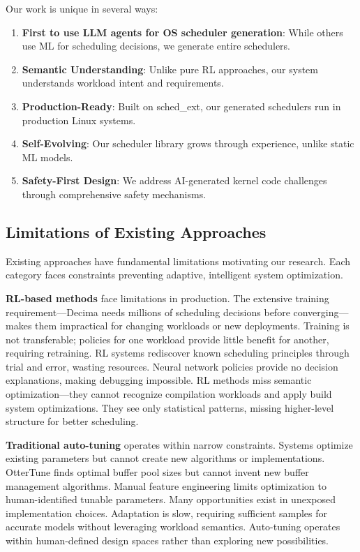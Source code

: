 Our work is unique in several ways:

\begin{enumerate}
\item \textbf{First to use LLM agents for OS scheduler generation}: While others use ML for scheduling decisions, we generate entire schedulers.

\item \textbf{Semantic Understanding}: Unlike pure RL approaches, our system understands workload intent and requirements.

\item \textbf{Production-Ready}: Built on sched\_ext, our generated schedulers run in production Linux systems.

\item \textbf{Self-Evolving}: Our scheduler library grows through experience, unlike static ML models.

\item \textbf{Safety-First Design}: We address AI-generated kernel code challenges through comprehensive safety mechanisms.
\end{enumerate}

\subsection{Limitations of Existing Approaches}

Existing approaches have fundamental limitations motivating our research. Each category faces constraints preventing adaptive, intelligent system optimization.

\textbf{RL-based methods} face limitations in production. The extensive training requirement—Decima needs millions of scheduling decisions before converging—makes them impractical for changing workloads or new deployments. Training is not transferable; policies for one workload provide little benefit for another, requiring retraining. RL systems rediscover known scheduling principles through trial and error, wasting resources. Neural network policies provide no decision explanations, making debugging impossible. RL methods miss semantic optimization—they cannot recognize compilation workloads and apply build system optimizations. They see only statistical patterns, missing higher-level structure for better scheduling.

\textbf{Traditional auto-tuning} operates within narrow constraints. Systems optimize existing parameters but cannot create new algorithms or implementations. OtterTune finds optimal buffer pool sizes but cannot invent new buffer management algorithms. Manual feature engineering limits optimization to human-identified tunable parameters. Many opportunities exist in unexposed implementation choices. Adaptation is slow, requiring sufficient samples for accurate models without leveraging workload semantics. Auto-tuning operates within human-defined design spaces rather than exploring new possibilities.

